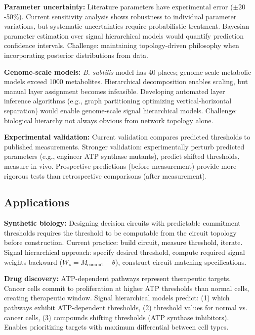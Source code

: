 \documentclass[10pt,letterpaper]{article}
\begin{document}
\textbf{Parameter uncertainty:} Literature parameters have experimental error ($\pm 20$-50\%). Current sensitivity analysis shows robustness to individual parameter variations, but systematic uncertainties require probabilistic treatment. Bayesian parameter estimation over signal hierarchical models would quantify prediction confidence intervals. Challenge: maintaining topology-driven philosophy when incorporating posterior distributions from data.

\textbf{Genome-scale models:} \textit{B. subtilis} model has 40 places; genome-scale metabolic models exceed 1000 metabolites. Hierarchical decomposition enables scaling, but manual layer assignment becomes infeasible. Developing automated layer inference algorithms (e.g., graph partitioning optimizing vertical-horizontal separation) would enable genome-scale signal hierarchical models. Challenge: biological hierarchy not always obvious from network topology alone.

\textbf{Experimental validation:} Current validation compares predicted thresholds to published measurements. Stronger validation: experimentally perturb predicted parameters (e.g., engineer ATP synthase mutants), predict shifted thresholds, measure in vivo. Prospective predictions (before measurement) provide more rigorous tests than retrospective comparisons (after measurement).

\subsection{Applications}

\textbf{Synthetic biology:} Designing decision circuits with predictable commitment thresholds requires the threshold to be computable from the circuit topology before construction. Current practice: build circuit, measure threshold, iterate. Signal hierarchical approach: specify desired threshold, compute required signal weights backward ($W_s = M_{\text{commit}} - \theta$), construct circuit matching specifications.

\textbf{Drug discovery:} ATP-dependent pathways represent therapeutic targets. Cancer cells commit to proliferation at higher ATP thresholds than normal cells, creating therapeutic window. Signal hierarchical models predict: (1) which pathways exhibit ATP-dependent thresholds, (2) threshold values for normal vs. cancer cells, (3) compounds shifting thresholds (ATP synthase inhibitors). Enables prioritizing targets with maximum differential between cell types.
\end{document}
